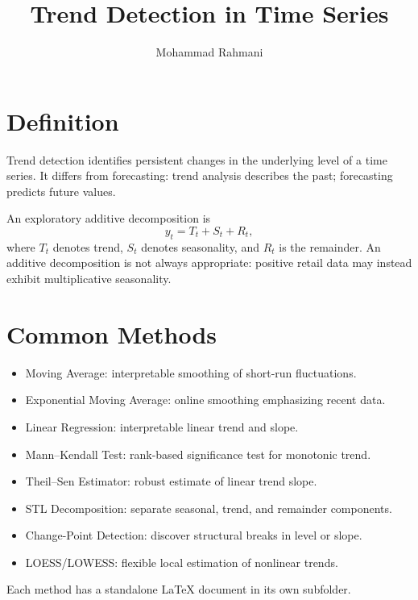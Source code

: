 \documentclass[a4paper]{article}
\title{Trend Detection in Time Series}
\date{}
\author{Mohammad Rahmani}
\begin{document}
\maketitle

\section{Definition}
Trend detection identifies persistent changes in the underlying level of a time series. It differs from forecasting: trend analysis describes the past; forecasting predicts future values.

An exploratory additive decomposition is
\[
 y_t = T_t + S_t + R_t,
\]
where $T_t$ denotes trend, $S_t$ denotes seasonality, and $R_t$ is the remainder. An additive decomposition is not always appropriate: positive retail data may instead exhibit multiplicative seasonality.

\section{Common Methods}
\begin{itemize}
 \item Moving Average: interpretable smoothing of short-run fluctuations.
 \item Exponential Moving Average: online smoothing emphasizing recent data.
 \item Linear Regression: interpretable linear trend and slope.
 \item Mann--Kendall Test: rank-based significance test for monotonic trend.
 \item Theil--Sen Estimator: robust estimate of linear trend slope.
 \item STL Decomposition: separate seasonal, trend, and remainder components.
 \item Change-Point Detection: discover structural breaks in level or slope.
 \item LOESS/LOWESS: flexible local estimation of nonlinear trends.
\end{itemize}
Each method has a standalone LaTeX document in its own subfolder.
\end{document}
